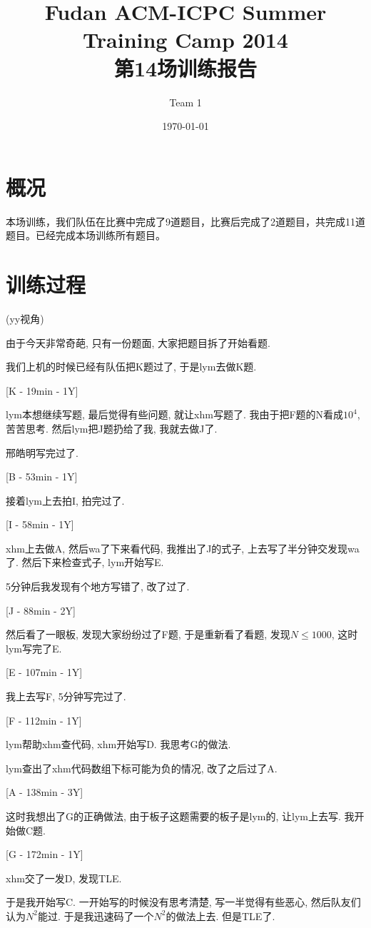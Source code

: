 \documentclass[a4paper, 11pt, nofonts, nocap, fancyhdr]{ctexart}
\title{Fudan ACM-ICPC Summer Training Camp 2014\\第14场训练报告}
\author{Team 1}
\date{\today}
\begin{document}
\maketitle

\section{概况}

本场训练，我们队伍在比赛中完成了9道题目，比赛后完成了2道题目，共完成11道题目。已经完成本场训练所有题目。


\section{训练过程}

(yy视角)

由于今天非常奇葩, 只有一份题面, 大家把题目拆了开始看题.

我们上机的时候已经有队伍把K题过了, 于是lym去做K题.

[K - 19min - 1Y]

lym本想继续写题, 最后觉得有些问题, 就让xhm写题了. 我由于把F题的N看成$10^4$, 苦苦思考. 然后lym把J题扔给了我, 我就去做J了.

邢皓明写完过了.

[B - 53min - 1Y]

接着lym上去拍I, 拍完过了.

[I - 58min - 1Y]

xhm上去做A, 然后wa了下来看代码, 我推出了J的式子, 上去写了半分钟交发现wa了. 然后下来检查式子, lym开始写E.

5分钟后我发现有个地方写错了, 改了过了.

[J - 88min - 2Y]

然后看了一眼板, 发现大家纷纷过了F题, 于是重新看了看题, 发现$N \leq 1000$, 这时lym写完了E.

[E - 107min - 1Y]

我上去写F, 5分钟写完过了.

[F - 112min - 1Y]

lym帮助xhm查代码, xhm开始写D. 我思考G的做法.

lym查出了xhm代码数组下标可能为负的情况, 改了之后过了A.

[A - 138min - 3Y]

这时我想出了G的正确做法, 由于板子这题需要的板子是lym的, 让lym上去写. 我开始做C题.

[G - 172min - 1Y]

xhm交了一发D, 发现TLE.

于是我开始写C. 一开始写的时候没有思考清楚, 写一半觉得有些恶心, 然后队友们认为$N^2$能过. 于是我迅速码了一个$N^2$的做法上去. 但是TLE了.
\end{document}
